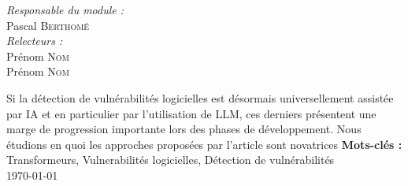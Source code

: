 \begin{titlepage}
\begin{center}
\begin{minipage}{0.4\textwidth}
\begin{flushleft}
            \end{flushleft}
        \end{minipage}
        \begin{minipage}{0.4\textwidth}
            \begin{flushright} \large
                \emph{Responsable du module :} \\
                Pascal \textsc{Berthomé}\\
                \emph{Relecteurs :} \\
                Prénom \textsc{Nom}\\
                Prénom \textsc{Nom}\\
            \end{flushright}
        \end{minipage}
        \vfill
        Si la détection de vulnérabilités logicielles est désormais universellement assistée par
        IA et en particulier par l'utilisation de LLM, ces derniers présentent une marge de
        progression importante lors des phases de développement. Nous étudions en quoi les
        approches proposées par l'article sont novatrices \vfill
        \textbf{Mots-clés :} Transformeurs, Vulnerabilités logicielles, Détection de
    vulnérabilités\\
        \vfill
        {\large \today}
    \end{center}
\end{titlepage}